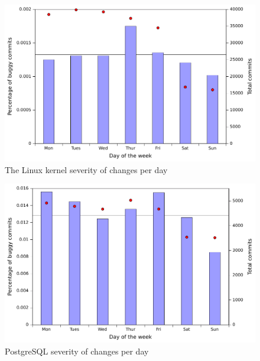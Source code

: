 \begin{figure}
\begin{center}
\includegraphics[width=\columnwidth]{linux-severity-day.pdf}
\end{center}
\caption{The Linux kernel severity of changes per day}
\label{fig-linux-severity-day}
\end{figure}

\begin{figure}
\begin{center}
\includegraphics[width=\columnwidth]{postgresql-severity-day.pdf}
\end{center}
\caption{PostgreSQL severity of changes per day}
\label{fig-postgresql-severity-day}
\end{figure}

